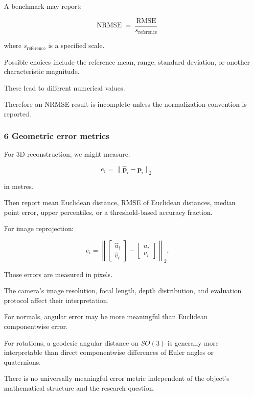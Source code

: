 A benchmark may report:

\[
 \operatorname{NRMSE} = \frac{\operatorname{RMSE}}{s_{\mathrm{reference}}}
\]

where \(s_{\mathrm{reference}}\) is a specified scale.

Possible choices include the reference mean, range, standard deviation, or another characteristic magnitude.

These lead to different numerical values.

Therefore an NRMSE result is incomplete unless the normalization convention is reported.

\subsubsection{6 Geometric error metrics}\label{02-foundations-ii-ch030-geometric-error-metrics}

\hypertarget{02-foundations-ii-ch030-geometric-error-metrics}{}

For 3D reconstruction, we might measure:

\[
 e_i=\|\hat{\mathbf p}_i-\mathbf p_i\|_2
\]

in metres.

Then report mean Euclidean distance, RMSE of Euclidean distances, median point error, upper percentiles, or a threshold-based accuracy fraction.

For image reprojection:

\[
 e_i= \left\| \begin{bmatrix}\hat u_i\\\hat v_i\end{bmatrix} - \begin{bmatrix}u_i\\v_i\end{bmatrix} \right\|_2.
\]

Those errors are measured in pixels.

The camera's image resolution, focal length, depth distribution, and evaluation protocol affect their interpretation.

For normals, angular error may be more meaningful than Euclidean componentwise error.

For rotations, a geodesic angular distance on \(SO(3)\) is generally more interpretable than direct componentwise differences of Euler angles or quaternions.

There is no universally meaningful error metric independent of the object's mathematical structure and the research question.

